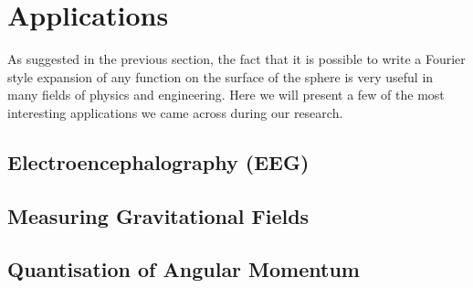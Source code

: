 
\section{Applications}

As suggested in the previous section, the fact that it is possible to write a
Fourier style expansion of any function on the surface of the sphere is very
useful in many fields of physics and engineering. Here we will present a few of
the most interesting applications we came across during our research.

\subsection{Electroencephalography (EEG)}

\begin{figure}
\end{figure}

\subsection{Measuring Gravitational Fields}

\subsection{Quantisation of Angular Momentum}
